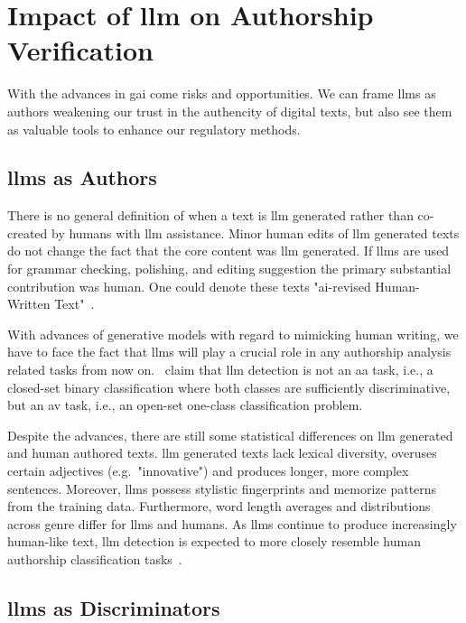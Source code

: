 \section{Impact of \acs{llm} on Authorship Verification}

With the advances in \ac{gai} come risks and opportunities.
We can frame \acp{llm} as authors weakening our trust in the authencity of digital texts, but also see them as valuable tools to enhance our regulatory methods.

\subsection{\acsp{llm} as Authors}
There is no general definition of when a text is \ac{llm} generated rather than co-created by humans with \ac{llm} assistance.
Minor human edits of \ac{llm} generated texts do not change the fact that the core content was \ac{llm} generated.
If \acp{llm} are used for grammar checking, polishing, and editing suggestion the primary substantial contribution was human.
One could denote these texts "\ac{ai}-revised Human-Written Text"~\citep{wang_stumbling_2024}.

With advances of generative models with regard to mimicking human writing, we have to face the fact that \acp{llm} will play a crucial role in any authorship analysis related tasks from now on.
\citet{llm_detection_av_2025}\ claim that \ac{llm} detection is not an \ac{aa} task, i.e., a closed-set binary classification where both classes are sufficiently discriminative, but an \ac{av} task, i.e., an open-set one-class classification problem. 

Despite the advances, there are still some statistical differences on \ac{llm} generated and human authored texts.
\ac{llm} generated texts lack lexical diversity, overuses certain adjectives (e.g.\ "innovative") and produces longer, more complex sentences.
Moreover, \acp{llm} possess stylistic fingerprints and memorize patterns from the training data.
Furthermore, word length averages and distributions across genre differ for \acp{llm} and humans.
As \acp{llm} continue to produce increasingly human-like text, \ac{llm} detection is expected to more closely resemble human authorship classification tasks~\citep{llm_detection_av_2025}.


\subsection{\acsp{llm} as Discriminators}
\label{sec:llm_discriminator}

